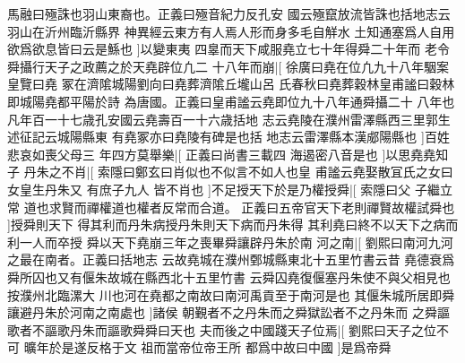 馬融曰殛誅也羽山東裔也。正義曰殛音紀力反孔安%
國云殛竄放流皆誅也括地志云羽山在沂州臨沂縣界%
%
神異經云東方有人焉人形而身多毛自觧水%
土知通塞爲人自用欲爲欲息皆曰云是鯀也%
]以變東夷%
%
四辠而天下咸服堯立七十年得舜二十年而%
%
老令舜攝行天子之政薦之於天堯辟位凢二%
%
十八年而崩|[%
徐廣曰堯在位凢九十八年駰案皇覽曰堯%
冢在濟隂城陽劉向曰堯葬濟隂丘壠山呂%
%
氏春秋曰堯葬穀林皇甫謐曰穀林即城陽堯都平陽於詩%
為唐國。正義曰皇甫謐云堯即位九十八年通舜攝二十%
%
八年也凡年百一十七歳孔安國云堯壽百一十六歳括地%
志云堯陵在濮州雷澤縣西三里郭生述征記云城陽縣東%
%
有堯冢亦曰堯陵有碑是也括%
地志云雷澤縣本漢郕陽縣也%
]百姓悲哀如喪父母三%
%
年四方莫舉樂|[%
正義曰尚書三載四%
海遏密八音是也%
]以思堯堯知子%
%
丹朱之不肖|[%
索隱曰鄭玄曰肖似也不似言不如人也皇%
甫謐云堯娶散冝氏之女曰女皇生丹朱又%
%
有庶子九人%
皆不肖也%
]不足授天下於是乃權授舜|[%
索隱曰父%
子繼立常%
%
道也求賢而禪權道也權者反常而合道。%
正義曰五帝官天下老則禪賢故權試舜也%
]授舜則天下%
%
得其利而丹朱病授丹朱則天下病而丹朱得%
%
其利堯曰終不以天下之病而利一人而卒授%
%
舜以天下堯崩三年之喪畢舜讓辟丹朱於南%
%
河之南|[%
劉熙曰南河九河之最在南者。正義曰括地志%
云故堯城在濮州鄄城縣東北十五里竹書云昔%
%
堯德衰爲舜所囚也又有偃朱故城在縣西北十五里竹書%
云舜囚堯復偃塞丹朱使不與父相見也按濮州北臨漯大%
%
川也河在堯都之南故曰南河禹貢至于南河是也%
其偃朱城所居即舜讓避丹朱於河南之南處也%
]諸侯%
%
朝覲者不之丹朱而之舜獄訟者不之丹朱而%
%
之舜謳歌者不謳歌丹朱而謳歌舜舜曰天也%
%
夫而後之中國踐天子位焉|[%
劉熙曰天子之位不可%
曠年於是遂反格于文%
%
祖而當帝位帝王所%
都爲中故曰中國%
]是爲帝舜%
